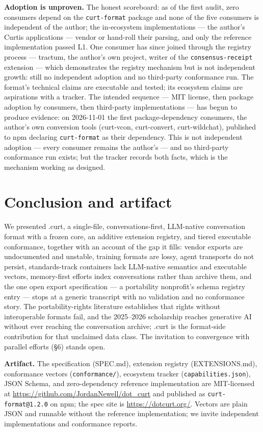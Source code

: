 \documentclass[11pt]{article}
\begin{document}
\textbf{Adoption is unproven.} The honest scoreboard: as of the first audit, zero consumers depend on the \texttt{curt-format} package and none of the five consumers is independent of the author; the in-ecosystem implementations --- the author's Curtis applications --- vendor or hand-roll their parsing, and only the reference implementation passed L1. One consumer has since joined through the registry process --- tractum, the author's own project, writer of the \texttt{consensus-receipt} extension --- which demonstrates the registry mechanism but is not independent growth: still no independent adoption and no third-party conformance run. The format's technical claims are executable and tested; its ecosystem claims are aspirations with a tracker. The intended sequence --- MIT license, then package adoption by consumers, then third-party implementations --- has begun to produce evidence: on 2026-11-01 the first package-dependency consumers, the author's own conversion tools (curt-vcon, curt-convert, curt-wildchat), published to npm declaring \texttt{curt-format} as their dependency. This is not independent adoption --- every consumer remains the author's --- and no third-party conformance run exists; but the tracker records both facts, which is the mechanism working as designed.

\section{Conclusion and artifact}

We presented .curt, a single-file, conversations-first, LLM-native conversation format with a frozen core, an additive extension registry, and tiered executable conformance, together with an account of the gap it fills: vendor exports are undocumented and unstable, training formats are lossy, agent transports do not persist, standards-track containers lack LLM-native semantics and executable vectors, memory-first efforts index conversations rather than archive them, and the one open export specification --- a portability nonprofit's schema registry entry --- stops at a generic transcript with no validation and no conformance story. The portability-rights literature establishes that rights without interoperable formats fail, and the 2025--2026 scholarship reaches generative AI without ever reaching the conversation archive; .curt is the format-side contribution for that unclaimed data class. The invitation to convergence with parallel efforts (\S6) stands open.

\textbf{Artifact.} The specification (SPEC.md), extension registry (EXTENSIONS.md), conformance vectors (\texttt{conformance/}), ecosystem tracker (\texttt{capabilities.json}), JSON Schema, and zero-dependency reference implementation are MIT-licensed at \url{https://github.com/JordanNewell/dot_curt} and published as \texttt{curt-format@1.2.0} on npm; the spec site is \url{https://dotcurt.org/}. Vectors are plain JSON and runnable without the reference implementation; we invite independent implementations and conformance reports.
\end{document}
